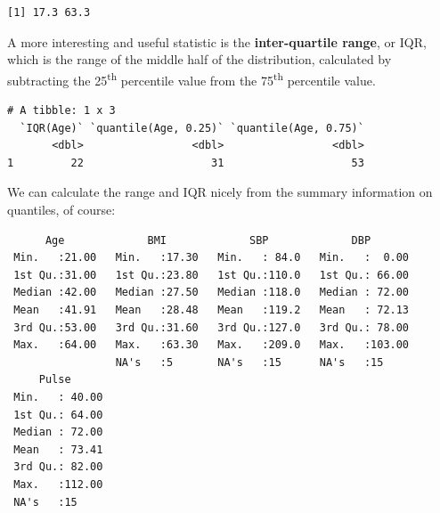 \documentclass[
]{book}
\newenvironment{Shaded}{\begin{snugshade}}{\end{snugshade}}
\newcommand{\FloatTok}[1]{\textcolor[rgb]{0.00,0.00,0.81}{#1}}
\newcommand{\KeywordTok}[1]{\textcolor[rgb]{0.13,0.29,0.53}{\textbf{#1}}}
\newcommand{\NormalTok}[1]{#1}
\newcommand{\OperatorTok}[1]{\textcolor[rgb]{0.81,0.36,0.00}{\textbf{#1}}}
\newcommand{\StringTok}[1]{\textcolor[rgb]{0.31,0.60,0.02}{#1}}
\begin{document}
\begin{verbatim}
[1] 17.3 63.3
\end{verbatim}

A more interesting and useful statistic is the \textbf{inter-quartile range}, or IQR, which is the range of the middle half of the distribution, calculated by subtracting the 25\textsuperscript{th} percentile value from the 75\textsuperscript{th} percentile value.

\begin{Shaded}
\end{Shaded}

\begin{verbatim}
# A tibble: 1 x 3
  `IQR(Age)` `quantile(Age, 0.25)` `quantile(Age, 0.75)`
       <dbl>                 <dbl>                 <dbl>
1         22                    31                    53
\end{verbatim}

We can calculate the range and IQR nicely from the summary information on quantiles, of course:

\begin{Shaded}
\end{Shaded}

\begin{verbatim}
      Age             BMI             SBP             DBP        
 Min.   :21.00   Min.   :17.30   Min.   : 84.0   Min.   :  0.00  
 1st Qu.:31.00   1st Qu.:23.80   1st Qu.:110.0   1st Qu.: 66.00  
 Median :42.00   Median :27.50   Median :118.0   Median : 72.00  
 Mean   :41.91   Mean   :28.48   Mean   :119.2   Mean   : 72.13  
 3rd Qu.:53.00   3rd Qu.:31.60   3rd Qu.:127.0   3rd Qu.: 78.00  
 Max.   :64.00   Max.   :63.30   Max.   :209.0   Max.   :103.00  
                 NA's   :5       NA's   :15      NA's   :15      
     Pulse       
 Min.   : 40.00  
 1st Qu.: 64.00  
 Median : 72.00  
 Mean   : 73.41  
 3rd Qu.: 82.00  
 Max.   :112.00  
 NA's   :15      
\end{verbatim}
\end{document}
